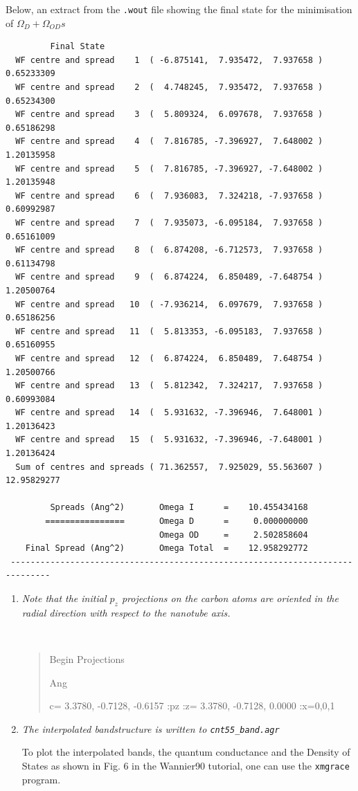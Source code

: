 \newpage
Below, an extract from the {\tt .wout} file showing the final state for the minimisation of $\Omega_D + \Omega_{OD}s$
\begin{tcolorbox}[sharp corners,boxrule=0.5pt]
\small{
\begin{verbatim}
    	 Final State
  WF centre and spread    1  ( -6.875141,  7.935472,  7.937658 )     0.65233309
  WF centre and spread    2  (  4.748245,  7.935472,  7.937658 )     0.65234300
  WF centre and spread    3  (  5.809324,  6.097678,  7.937658 )     0.65186298
  WF centre and spread    4  (  7.816785, -7.396927,  7.648002 )     1.20135958
  WF centre and spread    5  (  7.816785, -7.396927, -7.648002 )     1.20135948
  WF centre and spread    6  (  7.936083,  7.324218, -7.937658 )     0.60992987
  WF centre and spread    7  (  7.935073, -6.095184,  7.937658 )     0.65161009
  WF centre and spread    8  (  6.874208, -6.712573,  7.937658 )     0.61134798
  WF centre and spread    9  (  6.874224,  6.850489, -7.648754 )     1.20500764
  WF centre and spread   10  ( -7.936214,  6.097679,  7.937658 )     0.65186256
  WF centre and spread   11  (  5.813353, -6.095183,  7.937658 )     0.65160955
  WF centre and spread   12  (  6.874224,  6.850489,  7.648754 )     1.20500766
  WF centre and spread   13  (  5.812342,  7.324217,  7.937658 )     0.60993084
  WF centre and spread   14  (  5.931632, -7.396946,  7.648001 )     1.20136423
  WF centre and spread   15  (  5.931632, -7.396946, -7.648001 )     1.20136424
  Sum of centres and spreads ( 71.362557,  7.925029, 55.563607 )    12.95829277
 
         Spreads (Ang^2)       Omega I      =    10.455434168
        ================       Omega D      =     0.000000000
                               Omega OD     =     2.502858604
    Final Spread (Ang^2)       Omega Total  =    12.958292772
 ------------------------------------------------------------------------------
 \end{verbatim}
 }
 \end{tcolorbox}


\begin{enumerate}\addtocounter{enumi}{1}
 \item {\it Note that the initial $p_z$ projections on the carbon atoms are oriented in the radial direction with
respect to the nanotube axis.}

{\tt
\begin{quote}

Begin Projections

Ang

c=   3.3780, -0.7128, -0.6157 :pz {\color{red}:z=  3.3780, -0.7128,  0.0000 :x=0,0,1}

\end{quote}
}

\item {\it The interpolated bandstructure is written to {\tt cnt55\_band.agr}}

To plot the interpolated bands, the quantum conductance and the Density of States as shown in Fig. 6 in the {\sc Wannier90} tutorial, one can use the {\tt xmgrace} program.
\end{enumerate}

